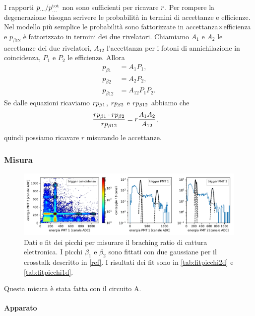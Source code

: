 I rapporti $p_{\dots} / p_{\dots}^\text{tot}$ non sono sufficienti per ricavare $r$.
Per rompere la degenerazione bisogna scrivere le probabilità in termini di accettanze e efficienze.
Nel modello più semplice le probabilità sono fattorizzate in accettanza$\times$efficienza
e $p_{\beta12}$ è fattorizzato in termini dei due rivelatori.
Chiamiamo $A_1$ e $A_2$ le accettanze dei due rivelatori,
$A_{12}$ l'accettanza per i fotoni di annichilazione in coincidenza,
$P_1$ e $P_2$ le efficienze.
Allora
\begin{align*}
	p_{\beta1}
	&= A_1 P_1, \\
	p_{\beta2}
	&= A_2 P_2, \\
	p_{\beta12}
	&= A_{12} P_1 P_2.
\end{align*}
Se dalle equazioni ricaviamo $r p_{\beta1}$, $r p_{\beta2}$ e $r p_{\beta12}$ abbiamo che
\begin{align}
	\label{eq:R}
	\frac {r p_{\beta1} \cdot r p_{\beta2}} {r p_{\beta12}}
	&= r \frac{A_1 A_2}{A_{12}},
\end{align}
quindi possiamo ricavare $r$ misurando le accettanze.

\subsubsection{Misura}

\begin{figure}
	\hspace{-0.25\textwidth}
	\includegraphics[width=1.5\textwidth]{immagini/ec}
	\caption{\label{fig:ec}
	Dati e fit dei picchi per misurare il braching ratio di cattura elettronica.
	I picchi $\beta_1$ e $\beta_2$ sono fittati con due gaussiane per il crosstalk descritto in \autoref{ref}.
	I risultati dei fit sono in \autoref{tab:fitpicchi2d} e \autoref{tab:fitpicchi1d}.}
\end{figure}

Questa misura è stata fatta con il circuito A.

\paragraph{Apparato}

